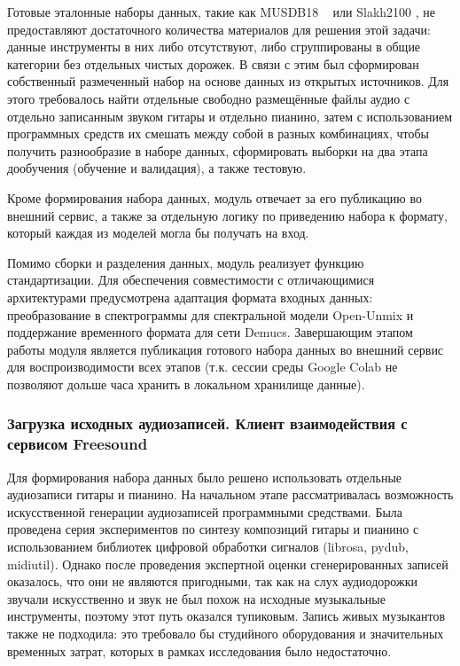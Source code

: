 \documentclass[14pt]{extarticle}
\begin{document}
Готовые эталонные наборы данных, такие как MUSDB18 ~\cite{MUSDB18} или Slakh2100 \cite{Slakh2100}, не предоставляют достаточного количества материалов 
для решения этой задачи: данные инструменты в них либо отсутствуют, либо сгруппированы в общие категории без 
отдельных чистых дорожек. В связи с этим был сформирован собственный размеченный набор на основе данных из открытых источников.
Для этого требовалось найти отдельные свободно размещённые файлы аудио с отдельно записанным звуком гитары и отдельно пианино,
затем с использованием программных средств их смешать между собой в разных комбинациях, чтобы получить разнообразие в наборе данных, 
сформировать выборки на два этапа дообучения (обучение и валидация), а также тестовую.

Кроме формирования набора данных, модуль отвечает за его публикацию во внешний сервис, а также за отдельную логику
по приведению набора к формату, который каждая из моделей могла бы получать на вход. 

Помимо сборки и разделения данных, модуль реализует функцию стандартизации. Для обеспечения совместимости с отличающимися
архитектурами предусмотрена адаптация формата входных данных: преобразование в спектрограммы для спектральной модели
Open-Unmix и поддержание временного формата для сети Demucs.
Завершающим этапом работы модуля является публикация готового набора данных во внешний сервис для воспроизводимости всех этапов 
(т.к. сессии среды Google Colab не позволяют дольше часа хранить в локальном хранилище данные).

\subsubsection{Загрузка исходных аудиозаписей. Клиент взаимодействия с сервисом Freesound}

Для формирования набора данных было решено использовать отдельные аудиозаписи гитары и пианино.
На начальном этапе рассматривалась возможность искусственной генерации аудиозаписей программными средствами.
Была проведена серия экспериментов по синтезу композиций гитары и пианино с использованием библиотек цифровой 
обработки сигналов (librosa, pydub, midiutil). Однако после проведения экспертной оценки сгенерированных записей
оказалось, что они не являются пригодными, так как на слух аудиодорожки звучали искусственно и 
звук не был похож на исходные музыкальные инструменты, поэтому этот путь оказался тупиковым.
Запись живых музыкантов также не подходила: это требовало бы студийного оборудования и значительных временных затрат,
которых в рамках исследования было недостаточно.
\end{document}
